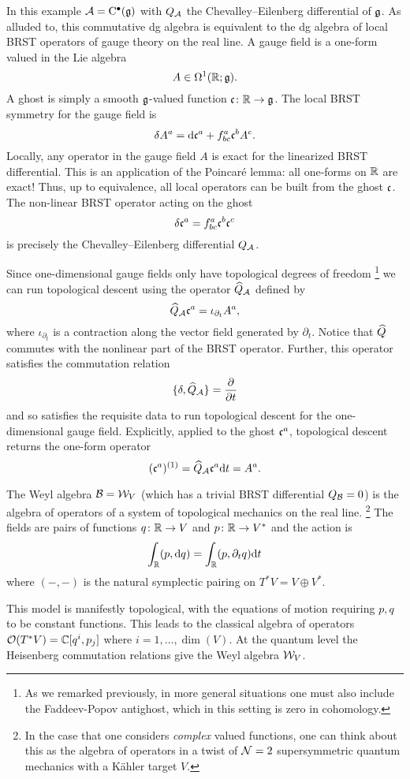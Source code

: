 \documentclass[11pt]{amsart}
\begin{document}
In this example $\cA = \clie^\bu(\fg)$ with $Q_{\cA}$ the Chevalley--Eilenberg differential of $\fg$.
As alluded to, this commutative dg algebra is equivalent to the dg algebra of local BRST operators of gauge theory on the real line. 
A gauge field is a one-form valued in the Lie algebra
\[
A \in \Omega^1(\RR ; \fg) .
\]
A ghost is simply a smooth $\fg$-valued function $\fc \colon \RR \to \fg$. 
The local BRST symmetry for the gauge field is
\[
\delta A^a = \d \fc^a + f_{bc}^a \fc^b A^c .
\]
Locally, any operator in the gauge field $A$ is exact for the linearized BRST differential. This is an application of the Poincar\'e lemma: all one-forms on $\RR$ are exact!
Thus, up to equivalence, all local operators can be built from the ghost $\fc$. 
The non-linear BRST operator acting on the ghost 
\[
\delta \fc^a = f_{bc}^a \fc^b \fc^c 
\]
is precisely the Chevalley--Eilenberg differential $Q_\cA$.

Since one-dimensional gauge fields only have topological degrees of freedom \footnote{As we remarked previously, in more general situations one must also include the Faddeev-Popov antighost, which in this setting is zero in cohomology.} we can run topological descent using the operator $\Hat{Q}_\cA$ defined by
\[
\Hat{Q}_\cA \fc^a = \iota_{\partial_t} A^a ,
\] where $ \iota_{\partial_t}$ is a contraction along the vector field generated by $\partial_t$. 
Notice that $\Hat{Q}$ commutes with the nonlinear part of the BRST operator. 
Further, this operator satisfies the commutation relation 
\[
\{\delta , \Hat{Q}_\cA\} = \frac{\partial}{\partial t} 
\]
and so satisfies the requisite data to run topological descent for the one-dimensional gauge field. 
Explicitly, applied to the ghost $\fc^a$, topological descent returns the one-form operator 
\[
(\fc^a)^{(1)} = \Hat{Q}_\cA \fc^a \d t = A^a  .
\]

The Weyl algebra $\cB = \cW_V$ (which has a trivial BRST differential $Q_{\cB} = 0$) is the algebra of operators of a system of topological mechanics on the real line. \footnote{In the case that one considers {\em complex} valued functions, one can think about this as the algebra of operators in a twist of $\cN=2$ supersymmetric quantum mechanics with a K\"ahler target $V$.}
The fields are pairs of functions $q  \colon \RR \to V$ and $p \colon \RR \to V^*$ and the action is 
\[
\int_\RR (p,\d q) = \int_\RR (p , \partial_t q) \d t 
\]
where $(-,-)$ is the natural symplectic pairing on $T^* V = V \oplus V^*$. 

This model is manifestly topological, with the equations of motion requiring $p,q$ to be constant functions.
This leads to the classical algebra of operators $\cO(T^* V) = \CC[q^i, p_j]$ where $i=1,\ldots, \dim (V)$. 
At the quantum level the Heisenberg commutation relations give the Weyl algebra $\cW_V$. 
 
\end{document}
